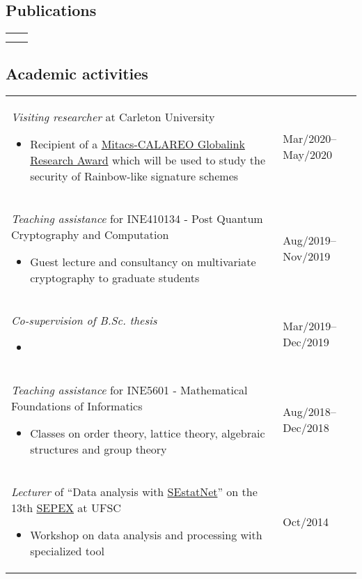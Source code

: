 \documentclass[12pt]{article}
\makeatletter
\newenvironment{datetable}
  {\newcolumntype{R}{>{\raggedleft\arraybackslash}p{0.14\textwidth}}
   \newcolumntype{L}{p{0.82\textwidth}}
   \begin{tabular}{@{\hspace{0mm}}LR}}
  {\end{tabular}}
\newenvironment{contenttable}[1]
  {\subsection*{#1}
   \begin{datetable}}
  {\end{datetable}}
\makeatother
\begin{document}
\begin{contenttable}{Publications}
  \hspace{0mm}
    & \cite{Zambonin:inproc:2019:jul} \vspace{1.25cm} \\

  \hspace{0mm}
    & \cite{Perin:inproc:2018:jun} \\
\end{contenttable}

\begin{contenttable}{Academic activities}
  \textit{Visiting researcher} at Carleton University
  \begin{itemize}
    \item Recipient of a \href{http://archive.is/RHxm4}{Mitacs-CALAREO
        Globalink Research Award} which will be used to study the security of
          Rainbow-like signature schemes
  \end{itemize} & Mar/2020--May/2020 \\

  \textit{Teaching assistance} for INE410134 - Post Quantum Cryptography and
    Computation
  \begin{itemize}
    \item Guest lecture and consultancy on multivariate cryptography to
        graduate students
  \end{itemize} & Aug/2019--Nov/2019 \\

  \textit{Co-supervision of B.Sc. thesis}
  \begin{itemize}
    \item {}
  \end{itemize} & Mar/2019--Dec/2019 \\

  \textit{Teaching assistance} for INE5601 - Mathematical Foundations of
    Informatics
  \begin{itemize}
    \item Classes on order theory, lattice theory, algebraic structures and
        group theory
  \end{itemize} & Aug/2018--Dec/2018 \\

  \textit{Lecturer} of ``Data analysis with
    \href{http://sestatnet.ufsc.br}{SEstatNet}'' on the 13th
    \href{https://sepex.ufsc.br/}{SEPEX} at UFSC
  \begin{itemize}
    \item Workshop on data analysis and processing with specialized tool
  \end{itemize} & Oct/2014 \\


\end{contenttable}
\end{document}
